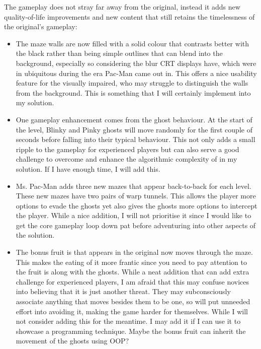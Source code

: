 \documentclass[letterpaper, 11pt]{article}
\begin{document}
The gameplay does not stray far away from the original, instead it adds new quality-of-life improvements and new content that still retains the timelessness of the original’s gameplay:

\begin{itemize}
\item The maze walls are now filled with a solid colour that contrasts better with the black rather than being simple outlines that can blend into the background, especially so considering the blur CRT displays have, which were in ubiquitous during the era Pac-Man came out in.
This offers a nice usability feature for the visually impaired, who may struggle to distinguish the walls from the background.
This is something that I will certainly implement into my solution.
\item One gameplay enhancement comes from the ghost behaviour.
At the start of the level, Blinky and Pinky ghosts will move randomly for the first couple of seconds before falling into their typical behaviour.
This not only adds a small ripple to the gameplay for experienced players but can also serve a good challenge to overcome and enhance the algorithmic complexity of in my solution.
If I have enough time, I will add this.

\item Ms. Pac-Man adds three new mazes that appear back-to-back for each level.
These new mazes have two pairs of warp tunnels.
This allows the player more options to evade the ghosts yet also gives the ghosts more options to intercept the player.
While a nice addition, I will not prioritise it since I would like to get the core gameplay loop down pat before adventuring into other aspects of the solution.

\item The bonus fruit is that appears in the original now moves through the maze.
This makes the eating of it more frantic since you need to pay attention to the fruit is along with the ghosts.
While a neat addition that can add extra challenge for experienced players, I am afraid that this may confuse novices into believing that it is just another threat.
They may subconsciously associate anything that moves besides them to be one, so will put unneeded effort into avoiding it, making the game harder for themselves.
While I will not consider adding this for the meantime. I may add it if I can use it to showcase a programming technique. Maybe the bonus fruit can inherit the movement of the ghosts using OOP?
\end{itemize}
\end{document}
